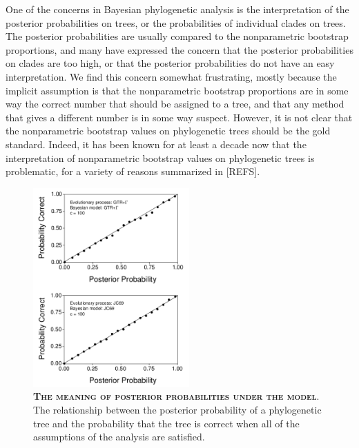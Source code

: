 \documentclass{svmult}
\begin{document}
One of the concerns in Bayesian phylogenetic analysis is the interpretation of the posterior
probabilities on trees, or the probabilities of individual clades on trees. The posterior
probabilities are usually compared to the nonparametric bootstrap proportions, and many have
expressed the concern that the posterior probabilities on clades are too high, or that the
posterior probabilities do not have an easy interpretation. We find this concern somewhat
frustrating, mostly because the implicit assumption is that the nonparametric bootstrap proportions
are in some way the correct number that should be assigned to a tree, and that any method that
gives a different number is in some way suspect. However, it is not clear that the nonparametric
bootstrap values on phylogenetic trees should be the gold standard. Indeed, it has been known for
at least a decade now that the interpretation of nonparametric bootstrap values on phylogenetic
trees is problematic, for a variety of reasons summarized in [REFS]. 

\begin{figure}[t]
\centering
\includegraphics[height=3in]{fig6}
\caption{\textbf{\textsc{The meaning of posterior probabilities under the model}}. The
relationship between the posterior probability of a phylogenetic tree and the probability that
the tree is correct when all of the assumptions of the analysis are satisfied.}
\label{fig6}
\end{figure}
\end{document}

